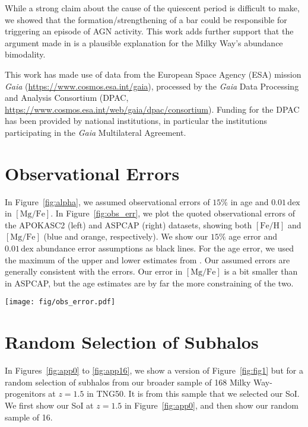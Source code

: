 \documentclass[linenumbers, twocolumn]{aastex631}
\newcommand{\FeH}{\ensuremath{[\textrm{Fe}/\textrm{H}]}}
\newcommand{\MgFe}{\ensuremath{[\textrm{Mg}/\textrm{Fe}]}}
\newcommand{\dex}{\ensuremath{\textrm{dex}}}
\begin{document}
While a strong claim about the cause of the quiescent period is difficult to make, we showed that the formation/strengthening of a bar could be responsible for triggering an episode of AGN activity. This work adds further support that the argument made in \citet{2024arXiv240707985B} is a plausible explanation for the Milky Way's abundance bimodality.

\begin{acknowledgements}
This work has made use of data from the European Space Agency (ESA) mission {\it Gaia} (\url{https://www.cosmos.esa.int/gaia}), processed by the {\it Gaia} Data Processing and Analysis Consortium (DPAC, \url{https://www.cosmos.esa.int/web/gaia/dpac/consortium}). Funding for the DPAC has been provided by national institutions, in particular the institutions participating in the {\it Gaia} Multilateral Agreement.
\end{acknowledgements}

{}


\appendix

\section{Observational Errors}\label{app:obs_err}
In Figure~\ref{fig:alpha}, we assumed observational errors of $15\%$ in age and $0.01\,\dex$ in \MgFe{}. In Figure~\ref{fig:obs_err}, we plot the quoted observational errors of the APOKASC2 (left) and ASPCAP (right) datasets, showing both \FeH{} and \MgFe{} (blue and orange, respectively). We show our $15\%$ age error and $0.01\,\dex$ abundance error assumptions as black lines. For the age error, we used the maximum of the upper and lower estimates from \citet{2018ApJS..239...32P}. Our assumed errors are generally consistent with the errors. Our error in \MgFe{} is a bit smaller than in ASPCAP, but the age estimates are by far the more constraining of the two.

\begin{figure*}
  \centering
  \texttt{[image: fig/obs\_error.pdf]}
  \caption{The observational errors of the APOKASC2 (left) and ASPCAP dataset (right). We show, on the left, a line indicating a $15\%$ error in observed age and on the right a vertical line indicating a $0.01\,\dex$ error.}
  \label{fig:obs_err}
\end{figure*}

\section{Random Selection of Subhalos}\label{app:rand_fig1}
In Figures~\ref{fig:app0} to \ref{fig:app16}, we show a version of Figure~\ref{fig:fig1} but for a random selection of subhalos from our broader sample of 168 Milky Way-progenitors at $z=1.5$ in TNG50. It is from this sample that we selected our SoI. We first show our SoI at $z=1.5$ in Figure~\ref{fig:app0}, and then show our random sample of 16.
\end{document}
